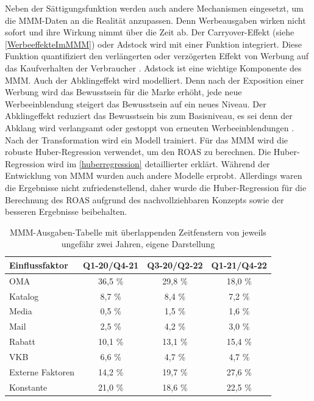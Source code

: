 Neben der Sättigungsfunktion werden auch andere Mechanismen eingesetzt, um die \ac{MMM}-Daten an die Realität anzupassen. Denn Werbeausgaben wirken nicht sofort und ihre Wirkung nimmt über die Zeit ab. Der Carryover-Effekt (siehe \autoref{WerbeeffekteImMMM}) oder Adstock wird mit einer Funktion integriert. Diese Funktion quantifiziert den verlängerten oder verzögerten Effekt von Werbung auf das Kaufverhalten der Verbraucher \cite{broadbent1979}. Adstock ist eine wichtige Komponente des \ac{MMM}. Auch der Abklingeffekt wird modelliert. Denn nach der Exposition einer Werbung wird das Bewusstsein für die Marke erhöht, jede neue Werbeeinblendung steigert das Bewusstsein auf ein neues Niveau. Der Abklingeffekt reduziert das Bewusstsein bis zum Basisniveau, es sei denn der Abklang wird verlangsamt oder gestoppt von erneuten Werbeeinblendungen \cite{Joseph2006Adstock}. Nach der Transformation wird ein Modell trainiert. Für das \ac{MMM} wird die robuste Huber-Regression verwendet, um den \ac{ROAS} zu berechnen. Die Huber-Regression wird im \autoref{huberregression} detaillierter erklärt. Während der Entwicklung von \ac{MMM} wurden auch andere Modelle erprobt. Allerdings waren die Ergebnisse nicht zufriedenstellend, daher wurde die Huber-Regression für die Berechnung des \ac{ROAS} aufgrund des nachvollziehbaren Konzepts sowie der besseren Ergebnisse beibehalten.
\begin{table}[H]
\centering
\renewcommand{\arraystretch}{1.3}
\setlength{\tabcolsep}{10pt}
\begin{tabular}{|l|c|c|c|}
\hline
\textbf{Einflussfaktor} & \textbf{Q1-20/Q4-21} & \textbf{Q3-20/Q2-22} & \textbf{Q1-21/Q4-22} \\ \hline
OMA                    & 36,5 \%               & 29,8 \%               & 18,0 \%               \\ \hline
Katalog                & 8,7 \%                & 8,4 \%                & 7,2 \%                \\ \hline
Media                  & 0,5 \%                & 1,5 \%                & 1,6 \%                \\ \hline
Mail                   & 2,5 \%                & 4,2 \%                & 3,0 \%                \\ \hline
Rabatt                 & 10,1 \%               & 13,1 \%               & 15,4 \%               \\ \hline
VKB                    & 6,6 \%                & 4,7 \%                & 4,7 \%                \\ \hline
Externe Faktoren       & 14,2 \%               & 19,7 \%               & 27,6 \%               \\ \hline
Konstante              & 21,0 \%               & 18,6 \%               & 22,5 \%               \\ \hline
\end{tabular}
\caption{\ac{MMM}-Ausgaben-Tabelle mit überlappenden Zeitfenstern von jeweils ungefähr zwei Jahren, eigene Darstellung}
\label{tab:mmmausgaben}
\end{table}
